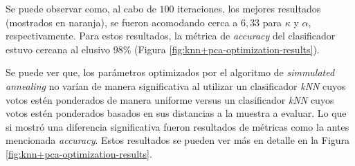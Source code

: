 \documentclass[a4paper]{article}
\begin{document}
    Se puede observar como, al cabo de $100$ iteraciones, los mejores resultados (mostrados en naranja), se fueron acomodando cerca a $6, 33$ para $\kappa$ y $\alpha$, respectivamente. 
    Para estos resultados, la métrica de \emph{accuracy} del clasificador estuvo cercana al elusivo $98\%$ (Figura \ref{fig:knn+pca-optimization-results}).
    
    Se puede ver que, los parámetros optimizados por el algoritmo de \emph{simmulated annealing} no varían de manera significativa al utilizar un clasificador \emph{kNN} cuyos votos estén ponderados de manera uniforme versus un clasificador \emph{kNN} cuyos votos estén ponderados basados en sus distancias a la muestra a evaluar. Lo que si mostró una diferencia significativa fueron resultados de métricas como la antes mencionada \emph{accuracy}. Estos resultados se pueden ver más en detalle en la Figura \ref{fig:knn+pca-optimization-results}.
    
\end{document}
